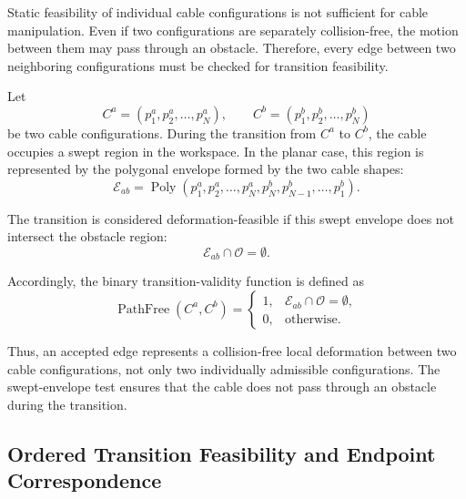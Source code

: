 \documentclass{pas}
\begin{document}
Static feasibility of individual cable configurations is not sufficient for
cable manipulation. Even if two configurations are separately collision-free,
the motion between them may pass through an obstacle. Therefore, every edge
between two neighboring configurations must be checked for transition
feasibility.

Let
\[
C^a=(p_1^a,p_2^a,\ldots,p_N^a),
\qquad
C^b=(p_1^b,p_2^b,\ldots,p_N^b)
\]
be two cable configurations. During the transition from \(C^a\) to \(C^b\),
the cable occupies a swept region in the workspace. In the planar case, this
region is represented by the polygonal envelope formed by the two cable shapes:
\begin{equation}
\mathcal{E}_{ab}
=
\operatorname{Poly}
\left(
p_1^{a},p_2^{a},\ldots,p_N^{a},
p_N^{b},p_{N-1}^{b},\ldots,p_1^{b}
\right).
\label{eq:swept_polygon_formulation}
\end{equation}

The transition is considered deformation-feasible if this swept envelope does
not intersect the obstacle region:
\begin{equation}
\mathcal{E}_{ab}\cap\mathcal{O}
=
\emptyset .
\label{eq:swept_envelope_free_condition}
\end{equation}

Accordingly, the binary transition-validity function is defined as
\begin{equation}
\operatorname{PathFree}(C^a,C^b)
=
\begin{cases}
1, & \mathcal{E}_{ab}\cap\mathcal{O}=\emptyset,\\
0, & \mathrm{otherwise}.
\end{cases}
\label{eq:pathfree_definition_formulation}
\end{equation}

Thus, an accepted edge represents a collision-free local deformation between
two cable configurations, not only two individually admissible configurations.
The swept-envelope test ensures that the cable does not pass through an
obstacle during the transition.


\subsection{Ordered Transition Feasibility and Endpoint Correspondence}
\label{subsec:ordered_transition_feasibility}
\end{document}
